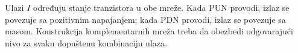 Ulazi $I$ određuju stanje tranzistora u obe mreže. Kada PUN provodi, izlaz se povezuje sa pozitivnim napajanjem; kada PDN provodi, izlaz se povezuje sa masom. Konstrukcija komplementarnih mreža treba da obezbedi odgovarajući nivo za svaku dopuštenu kombinaciju ulaza.
